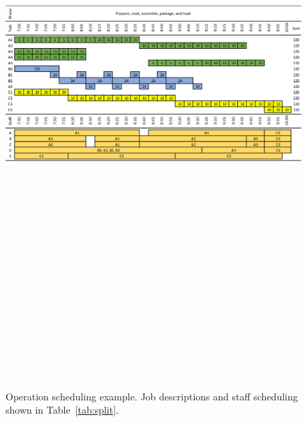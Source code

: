 \begin{figure}[H]
    \centering
    \includegraphics[angle=90, height=23cm]{ops_gantt.png}
    \caption{Operation scheduling example. Job descriptions and staff scheduling shown in Table~\ref{tab:split}.}
    \label{fig:gantt}
\end{figure}


